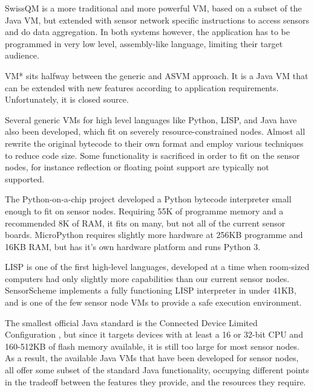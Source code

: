 SwissQM \cite{Muller:2007fs} is a more traditional and more powerful VM, based on a subset of the Java VM, but extended with sensor network specific instructions to access sensors and do data aggregation. In both systems however, the application has to be programmed in very low level, assembly-like language, limiting their target audience.

VM* \cite{Koshy:2005ww} sits halfway between the generic and ASVM approach. It is a Java VM that can be extended with new features according to application requirements. Unfortunately, it is closed source.

Several generic VMs for high level languages like Python, LISP, and Java have also been developed, which fit on severely resource-constrained nodes. Almost all rewrite the original bytecode to their own format and employ various techniques to reduce code size. Some functionality is sacrificed in order to fit on the sensor nodes, for instance reflection or floating point support are typically not supported.

The Python-on-a-chip project \cite{python-on-a-chip} developed a Python bytecode interpreter small enough to fit on sensor nodes. Requiring 55K of programme memory and a recommended 8K of RAM, it fits on many, but not all of the current sensor boards. MicroPython \cite{micropython} requires slightly more hardware at 256KB programme and 16KB RAM, but has it's own hardware platform and runs Python 3.

LISP is one of the first high-level languages, developed at a time when room-sized computers had only slightly more capabilities than our current sensor nodes. SensorScheme \cite{Evers:2010ur} implements a fully functioning LISP interpreter in under 41KB, and is one of the few sensor node VMs to provide a safe execution environment.


The smallest official Java standard is the Connected Device Limited Configuration \cite{CLDC}, but since it targets devices with at least a 16 or 32-bit CPU and 160-512KB of flash memory available, it is still too large for most sensor nodes. As a result, the available Java VMs that have been developed for sensor nodes, all offer some subset of the standard Java functionality, occupying different points in the tradeoff between the features they provide, and the resources they require.

